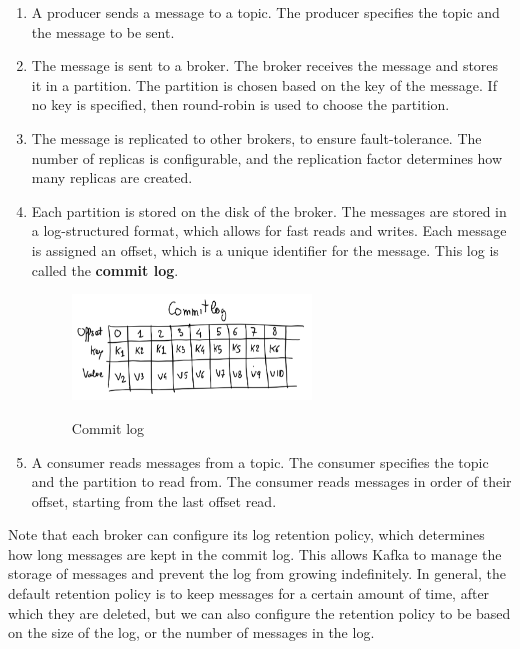 \begin{enumerate}
    \item A producer sends a message to a topic. The producer specifies the topic and the message to be 
    sent.

    \item The message is sent to a broker. The broker receives the message and stores it in a partition.
    The partition is chosen based on the key of the message. If no key is specified, then round-robin is used
    to choose the partition.

    \item The message is replicated to other brokers, to ensure fault-tolerance. The number of replicas
    is configurable, and the replication factor determines how many replicas are created.

    \item Each partition is stored on the disk of the broker. The messages are stored in a log-structured
    format, which allows for fast reads and writes. Each message is assigned an offset, which is a unique
    identifier for the message. This log is called the \textbf{commit log}.

    \begin{figure}[H]
        \centering
        \includegraphics[width=0.6\textwidth]{figures/commit_log.png}
        \label{fig:commit_log}
        \caption{Commit log}
    \end{figure}

    \item A consumer reads messages from a topic. The consumer specifies the topic and the partition to 
    read from. The consumer reads messages in order of their offset, starting from the last offset read.

\end{enumerate}

Note that each broker can configure its log retention policy, which determines how long messages are 
kept in the commit log. This allows Kafka to manage the storage of messages and prevent the log from
growing indefinitely. In general, the default retention policy is to keep messages for a certain amount
of time, after which they are deleted, but we can also configure the retention policy to be based on
the size of the log, or the number of messages in the log.\\

